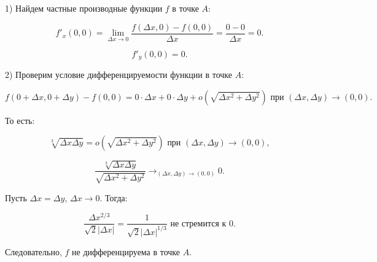 {1) Найдем частные производные функции \( f \) в точке \( A \):



\[
f'_x(0,0) = \lim_{\Delta x \to 0} \frac{f(\Delta x,0) - f(0,0)}{\Delta x} = \frac{0 - 0}{\Delta x} = 0.
\]





\[
f'_y(0,0) = 0.
\]



2) Проверим условие дифференцируемости функции в точке \( A \):



\[
f(0 + \Delta x, 0 + \Delta y) - f(0, 0) = 0 \cdot \Delta x + 0 \cdot \Delta y + o(\sqrt{\Delta x^2 + \Delta y^2}) \text{ при } (\Delta x, \Delta y) \to (0, 0).
\]



То есть:



\[
\sqrt[3]{\Delta x \Delta y} = o(\sqrt{\Delta x^2 + \Delta y^2}) \text{ при } (\Delta x, \Delta y) \to (0, 0),
\]





\[
\frac{\sqrt[3]{\Delta x \Delta y}}{\sqrt{\Delta x^2 + \Delta y^2}} \to_{(\Delta x, \Delta y) \to (0,0)} 0.
\]



Пусть \( \Delta x = \Delta y \), \( \Delta x \to 0 \). Тогда:



\[
\frac{\Delta x^{2/3}}{\sqrt{2} |\Delta x|} = \frac{1}{\sqrt{2} |\Delta x|^{1/3}} \text{ не стремится к } 0.
\]



Следовательно, \( f \) не дифференцируема в точке \( A \).


}